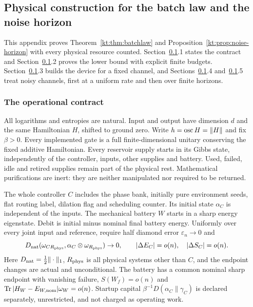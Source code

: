 \subsection{Physical construction for the batch law and the noise horizon}\label{kt:app:batchphys}

This appendix proves Theorem~\ref{kt:thm:batchlaw} and Proposition~\ref{kt:prop:noise-horizon} with every physical resource counted. Section~\ref{kt:app:batchphys}.1 states the contract and Section~\ref{kt:app:batchphys}.2 proves the lower bound with explicit finite budgets. Section~\ref{kt:app:batchphys}.3 builds the device for a fixed channel, and Sections~\ref{kt:app:batchphys}.4 and~\ref{kt:app:batchphys}.5 treat noisy channels, first at a uniform rate and then over finite horizons.

\subsubsection{The operational contract}\label{kt:bp-contract}
All logarithms and entropies are natural. Input and output have
dimension $d$ and the same Hamiltonian $H$, shifted to ground zero.
Write $h=\operatorname{osc} H=\|H\|$ and fix $\beta>0$. Every implemented gate is a full
finite-dimensional unitary conserving the fixed additive Hamiltonian.
Every reservoir supply starts in its Gibbs state, independently of
the controller, inputs, other supplies and battery. Used, failed, idle and
retired supplies remain part of the physical rest. Mathematical purifications are
inert: they are neither manipulated nor required to be returned.

The whole controller $C$ includes the phase bank, initially pure environment
seeds, flat routing label, dilation flag and scheduling counter. Its initial
state $\alpha_C$ is independent of the inputs. The mechanical battery
$W$ starts in a sharp energy eigenstate. Debit is initial minus nominal
final battery energy. Uniformly over every joint input and reference,
require half diamond error $\varepsilon_n\to0$ and
\[
 D_{\mathrm{nat}}(\omega_{C R_{\rm phys}},\alpha_C\otimes\omega_{R_{\rm phys}})\to0,
 \qquad |\Delta E_C|=o(n),\quad |\Delta S_C|=o(n).
\]
Here $D_{\mathrm{nat}}=\frac12\|\cdot\|_1$, $R_{\rm phys}$ is all physical systems other
than $C$, and the endpoint changes are actual and unconditional.
The battery has a common nominal sharp endpoint with vanishing failure,
$S(W_f)=o(n)$ and $\operatorname{Tr}|H_W-E_{W,\rm nom}|\omega_W=o(n)$.
Startup capital $\beta^{-1}D(\alpha_C\|\gamma_C)$ is declared separately,
unrestricted, and not charged as operating work.

